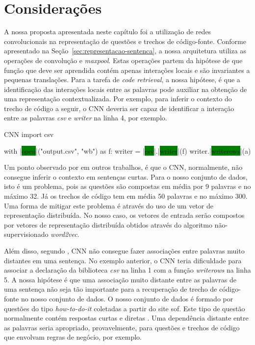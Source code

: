 \section{Considerações}

A nossa proposta apresentada neste capítulo foi a utilização de redes convolucionais na representação de questões e trechos de código-fonte. Conforme apresentado na Seção~\ref{sec:representacao-sentenca}, a nossa arquitetura utiliza as operações de convolução e \textit{maxpool}. Estas operações partem da hipótese de que função que deve ser aprendida contém apenas interações locais e são invariantes a pequenas translações. Para a tarefa de \textit{code retrieval}, a nossa hipótese, é que a identificação das interações locais entre as palavras pode auxiliar na obtenção de uma representação contextualizada. Por exemplo, para inferir o contexto do trecho de código a seguir, o CNN deveria ser capaz de identificar a interação entre as palavras \emph{csv} e \emph{writer} na linha 4, por exemplo. 

\begin{mypython-linenumber}{CNN}
import csv

with |\colorbox{green}{open}|("output.csv", "wb") as f:
    writer = |\colorbox{green}{csv}|.|\colorbox{green}{writer}|(f)
    writer.|\colorbox{green}{writerows}|(a)
\end{mypython-linenumber}

Um ponto observado por \cite{tom-young:trends-deep-learning-nlp} em outros trabalhos, é que o CNN, normalmente, não consegue inferir o contexto em sentenças curtas. Para o nosso conjunto de dados, isto é um problema, pois as questões são compostas em média por 9 palavras e no máximo 32. Já os trechos de código tem em média 50 palavras e no máximo 300. Uma forma de mitigar este problema é através do uso de um vetor de representação distribuída. No nosso caso, os vetores de entrada serão compostos por vetores de representação distribuída obtidos através do algoritmo não-supervisionado \textit{word2vec}.

Além disso, segundo \cite{Goodfellow-et-al-2016:convolutional-networks}, CNN não consegue fazer associações entre palavras muito distantes em uma sentença. No exemplo anterior, o CNN teria dificuldade para associar a declaração da biblioteca \emph{csv} na linha 1 com a função \emph{writerows} na linha 5. A nossa hipótese é que uma associação muito distante entre as palavras de uma sentença não seja tão importante para a recuperação de trecho de código-fonte no nosso conjunto de dados. O nosso conjunto de dados é formado por questões do tipo \textit{how-to-do-it} coletadas a partir do site \gls{sof}. Este tipo de questão normalmente contém respostas curtas e diretas  \citep{yao-2018}. Uma dependência distante entre as palavras seria apropriado, provavelmente, para questões e trechos de código que envolvam regras de negócio, por exemplo.


